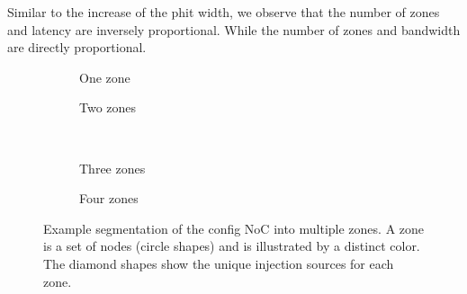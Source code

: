 Similar to the increase of the phit width, we observe that the number of zones and latency are inversely proportional. While the number of zones and bandwidth are directly proportional.

\begin{figure}[htbp]
    \centering
    \begin{subfigure}[b]{0.48\linewidth}
        \centering
        \begin{adjustbox}{width=0.6\linewidth}
            
        \end{adjustbox}
        \caption{One zone}
        \label{fig:segmentation_example_1}
    \end{subfigure}
    \hfill
    \begin{subfigure}[b]{0.48\linewidth}
        \centering
        \begin{adjustbox}{width=0.6\linewidth}
            
        \end{adjustbox}
        \caption{Two zones}
        \label{fig:segmentation_example_2}
    \end{subfigure}
    \\ \vspace{1.5em}
    \begin{subfigure}[b]{0.48\linewidth}
        \centering
        \begin{adjustbox}{width=0.6\linewidth}
            
        \end{adjustbox}
        \caption{Three zones}
        \label{fig:segmentation_example_3}
    \end{subfigure}
    \hfill
    \begin{subfigure}[b]{0.48\linewidth}
        \centering
        \begin{adjustbox}{width=0.6\linewidth}
            
        \end{adjustbox}
        \caption{Four zones}
        \label{fig:segmentation_example_4}
    \end{subfigure}
    \caption{
    Example segmentation of the config NoC into multiple zones.
    A zone is a set of nodes (circle shapes) and is illustrated by a distinct color.
    The diamond shapes show the unique injection sources for each zone.
    }
    \label{fig:segmentation_example}
\end{figure}
